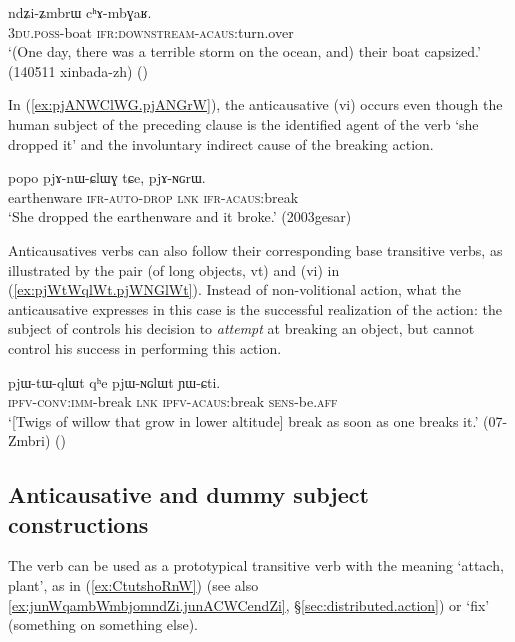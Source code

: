 \begin{exe}
\ex \label{ex:ndZimbrW.chAmbGAR}
\gll   ndʑi-ʑmbrɯ cʰɤ-mbɣaʁ. \\
 \textsc{3du}.\textsc{poss}-boat \textsc{ifr}:\textsc{downstream}-\textsc{acaus}:turn.over \\
\glt `(One day, there was a terrible storm  on the ocean, and) their boat capsized.' (140511 xinbada-zh) ()
\end{exe}

In (\ref{ex:pjANWClWG.pjANGrW}), the anticausative  (vi) occurs even though the human subject of the preceding clause is the identified agent of the verb  `she dropped it' and the involuntary indirect cause of the breaking action.

\begin{exe}
\ex \label{ex:pjANWClWG.pjANGrW}
\gll popo pjɤ-nɯ-ɕlɯɣ tɕe, pjɤ-ɴɢrɯ. \\
earthenware \textsc{ifr}-\textsc{auto}-\textsc{drop} \textsc{lnk} \textsc{ifr}-\textsc{acaus}:break \\
\glt `She dropped the earthenware and it broke.' (2003gesar)
\end{exe}

Anticausatives verbs can also follow their corresponding base transitive verbs, as illustrated by the pair  (of long objects, vt) and  (vi) in (\ref{ex:pjWtWqlWt.pjWNGlWt}). Instead of non-volitional action, what the anticausative   expresses in this case is the successful realization of the action: the subject of  controls his decision to \textit{attempt} at breaking an object, but cannot control his success in performing this action.

\begin{exe}
\ex \label{ex:pjWtWqlWt.pjWNGlWt} 
\gll pjɯ-tɯ-qlɯt qʰe pjɯ-ɴɢlɯt ɲɯ-ɕti. \\
\textsc{ipfv}-\textsc{conv}:\textsc{imm}-break \textsc{lnk} \textsc{ipfv}-\textsc{acaus}:break \textsc{sens}-be.\textsc{aff} \\
\glt `[Twigs of willow that grow in lower altitude] break as soon as one breaks it.' (07-Zmbri) 	()
\end{exe}

\subsection{Anticausative and dummy subject constructions} \label{sec:anticausative.dummy}
The verb  can be used as a prototypical transitive verb with the meaning `attach, plant', as in (\ref{ex:CtutshoRnW}) (see also \ref{ex:junWqambWmbjomndZi.junACWCendZi}, §\ref{sec:distributed.action}) or `fix' (something on something else).

